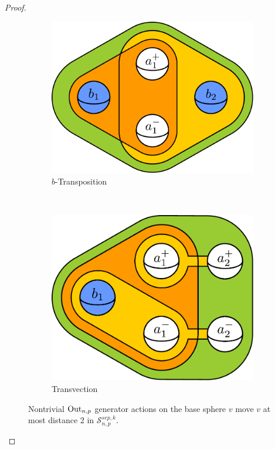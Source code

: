 \begin{proof}
\begin{figure}[b!]
\begin{subfigure}[b]{0.3\textwidth}
        \includegraphics[width=\textwidth]{figures/kput3.pdf}
        \caption{$b$-Transposition}
        \label{fig:kput3}
    \end{subfigure}
    ~ %
    \begin{subfigure}[b]{0.3\textwidth}
        \includegraphics[width=\textwidth]{figures/kput4.pdf}
        \caption{Transvection}
        \label{fig:kput4}
    \end{subfigure}
    \caption{Nontrivial $\operatorname{Out}_{n,p}$ generator actions on the
    base sphere $v$ move $v$ at most distance 2
    in $\mathcal S^{sep,k}_{n,p}$.}
    \label{fig:kput234}
\end{figure}
\end{proof}

